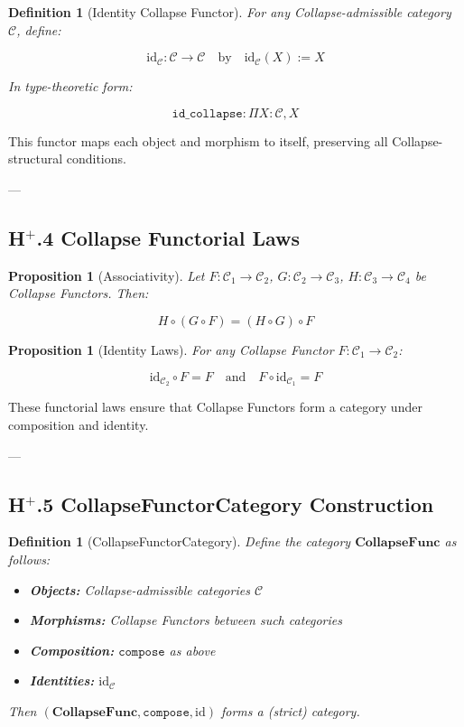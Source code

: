 \documentclass[11pt]{article}
\newtheorem{definition}[theorem]{Definition}
\newtheorem{proposition}[theorem]{Proposition}
\begin{document}
\begin{definition}[Identity Collapse Functor]
For any Collapse-admissible category $\mathcal{C}$, define:

\[
\mathrm{id}_{\mathcal{C}} : \mathcal{C} \to \mathcal{C}
\quad \text{by} \quad \mathrm{id}_{\mathcal{C}}(X) := X
\]

In type-theoretic form:

\[
\texttt{id\_collapse} : \Pi X : \mathcal{C}, X
\]
\end{definition}

This functor maps each object and morphism to itself, preserving all Collapse-structural conditions.

---

\subsection*{H$^{+}$.4 Collapse Functorial Laws}

\begin{proposition}[Associativity]
Let $F : \mathcal{C}_1 \to \mathcal{C}_2$, $G : \mathcal{C}_2 \to \mathcal{C}_3$, $H : \mathcal{C}_3 \to \mathcal{C}_4$ be Collapse Functors.  
Then:

\[
H \circ (G \circ F) = (H \circ G) \circ F
\]
\end{proposition}

\begin{proposition}[Identity Laws]
For any Collapse Functor $F : \mathcal{C}_1 \to \mathcal{C}_2$:

\[
\mathrm{id}_{\mathcal{C}_2} \circ F = F \quad \text{and} \quad F \circ \mathrm{id}_{\mathcal{C}_1} = F
\]
\end{proposition}

These functorial laws ensure that Collapse Functors form a category under composition and identity.

---

\subsection*{H$^{+}$.5 CollapseFunctorCategory Construction}

\begin{definition}[CollapseFunctorCategory]
Define the category $\mathbf{CollapseFunc}$ as follows:

\begin{itemize}
  \item \textbf{Objects:} Collapse-admissible categories $\mathcal{C}$
  \item \textbf{Morphisms:} Collapse Functors between such categories
  \item \textbf{Composition:} $\texttt{compose}$ as above
  \item \textbf{Identities:} $\mathrm{id}_{\mathcal{C}}$
\end{itemize}

Then $(\mathbf{CollapseFunc}, \texttt{compose}, \mathrm{id})$ forms a (strict) category.
\end{definition}
\end{document}

